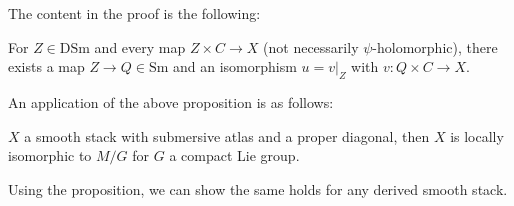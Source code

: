 The content in the proof is the following:

\begin{proposition}

For $Z\in \text{DSm}$ and every map $Z\times C \to X$ (not necessarily $\psi$-holomorphic), there exists a map $Z\to Q\in \text{Sm}$ and an isomorphism $u=v|_Z$ with $v: Q\times C\to X$.

\end{proposition}

An application of the above proposition is as follows:

\begin{theorem}
[Zung]

$X$ a smooth stack with submersive atlas and a proper diagonal, then $X$ is locally isomorphic to $M/G$ for $G$ a compact Lie group.

\end{theorem}

Using the proposition, we can show the same holds for any derived smooth stack.